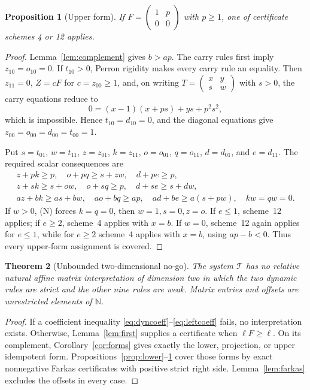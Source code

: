 \documentclass[11pt]{article}
\newtheorem{theorem}{Theorem}[section]
\newtheorem{proposition}[theorem]{Proposition}
\theoremstyle{definition}
\newcommand{\N}{\mathbb{N}}
\newcommand{\Tsys}{\mathcal{T}}
\newcommand{\mat}[4]{\begin{pmatrix}#1&#2\\#3&#4\end{pmatrix}}
\begin{document}
\begin{proposition}[Upper form]\label{prop:upper}
If $F=\mat{1}{p}{0}{0}$ with $p\ge1$, one of certificate schemes 4 or 12
applies.
\end{proposition}

\begin{proof}
Lemma~\ref{lem:complement} gives $b>ap$.  The carry rules first imply
$z_{10}=o_{10}=0$.  If $t_{10}>0$, Perron rigidity makes every carry rule
an equality.  Then $z_{11}=0$, $Z=cF$ for $c=z_{00}\ge1$, and, on writing
$T=\mat{x}{y}{s}{w}$ with $s>0$, the carry equations reduce to
\[
 0=(x-1)(x+ps)+ys+p^2s^2,
\]
which is impossible.  Hence $t_{10}=d_{10}=0$, and the diagonal equations
give $z_{00}=o_{00}=d_{00}=t_{00}=1$.

Put $s=t_{01}$, $w=t_{11}$, $z=z_{01}$, $k=z_{11}$,
$o=o_{01}$, $q=o_{11}$, $d=d_{01}$, and $e=d_{11}$.  The required
scalar consequences are
\begin{gather*}
 z+pk\ge p,\quad o+pq\ge s+zw,\quad d+pe\ge p,\\
 z+sk\ge s+ow,\quad o+sq\ge p,\quad d+se\ge s+dw,\\
 az+bk\ge as+bw,\quad ao+bq\ge ap,\quad
 ad+be\ge a(s+pw),\quad kw=qw=0.
\tag{N}
\end{gather*}
If $w>0$, (N) forces $k=q=0$, then $w=1,s=0,z=o$.  If $e\le1$,
scheme~12 applies; if $e\ge2$, scheme~4 applies with $x=b$.  If $w=0$,
scheme~12 again applies for $e\le1$, while for $e\ge2$ scheme~4 applies
with $x=b$, using $ap-b<0$.  Thus every upper-form assignment is covered.
\end{proof}

\begin{theorem}[Unbounded two-dimensional no-go]\label{thm:main}
The system $\Tsys$ has no relative natural affine matrix interpretation of
dimension two in which the two dynamic rules are strict and the other nine
rules are weak.  Matrix entries and offsets are unrestricted elements of
$\N$.
\end{theorem}

\begin{proof}
If a coefficient inequality
\eqref{eq:dyncoeff}--\eqref{eq:leftcoeff} fails, no interpretation exists.
Otherwise, Lemma~\ref{lem:first} supplies a certificate when
$\ell F\ge\ell$.  On its complement,
Corollary~\ref{cor:forms} gives exactly the lower, projection, or upper
idempotent form.  Propositions~\ref{prop:lower}--\ref{prop:upper} cover
those forms by exact nonnegative Farkas certificates with positive strict
right side.  Lemma~\ref{lem:farkas} excludes the offsets in every case.
\end{proof}
\end{document}
